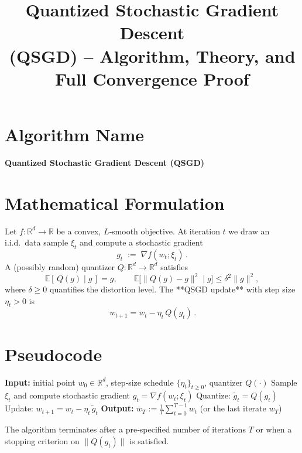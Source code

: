 \documentclass{article}
\newcommand{\E}{\mathbb{E}}
\newcommand{\R}{\mathbb{R}}
\begin{document}
\title{Quantized Stochastic Gradient Descent \\ (QSGD) – Algorithm, Theory, and Full Convergence Proof}
\author{}
\date{}
\maketitle

\tableofcontents
\newpage

\section*{Algorithm Name}
\begin{center}
\textbf{Quantized Stochastic Gradient Descent (QSGD)}
\end{center}

\section*{Mathematical Formulation}
Let $f:\R^{d}\to\R$ be a convex, $L$‑smooth objective. At iteration $t$ we draw an i.i.d.\ data sample $\xi_t$ and compute a stochastic gradient 
\[
g_t \;:=\; \nabla f(w_t;\xi_t)\, .
\]
A (possibly random) quantizer $Q:\R^{d}\to\R^{d}$ satisfies
\[
\E[\,Q(g)\mid g\,]=g ,\qquad 
\E\big[\|Q(g)-g\|^{2}\mid g\big]\le \delta^{2}\|g\|^{2},
\tag{1}
\]
where $\delta\ge 0$ quantifies the distortion level.  
The **QSGD update** with step size $\eta_t>0$ is
\[
\boxed{\,w_{t+1}=w_t-\eta_t\,Q(g_t)\,}. \tag{2}
\]

\section*{Pseudocode}
\begin{algorithm}[H]
\caption{Quantized Stochastic Gradient Descent}
\begin{algorithmic}[1]
\State \textbf{Input:} initial point $w_{0}\in\R^{d}$, step‑size schedule $\{\eta_t\}_{t\ge0}$, quantizer $Q(\cdot)$
    \State Sample $\xi_t$ and compute stochastic gradient $g_t=\nabla f(w_t;\xi_t)$
    \State Quantize: $\tilde g_t = Q(g_t)$
    \State Update: $w_{t+1}=w_t-\eta_t\,\tilde g_t$
\EndFor
\State \textbf{Output:} $\bar w_T:=\frac{1}{T}\sum_{t=0}^{T-1} w_t$ (or the last iterate $w_T$)
\end{algorithmic}
\end{algorithm}
The algorithm terminates after a pre‑specified number of iterations $T$ or when a stopping criterion on $\|Q(g_t)\|$ is satisfied.
\end{document}
